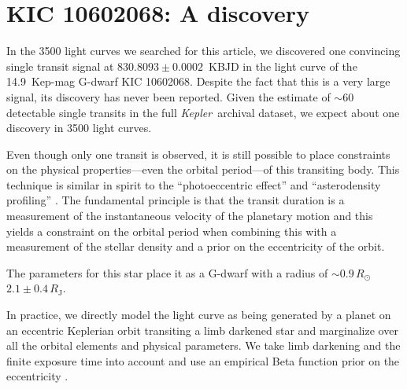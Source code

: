 \documentclass[12pt,preprint]{aastex}
\newcommand{\project}[1]{\textsl{#1}}
\newcommand{\kepler}{\project{Kepler}}
\newcommand{\paper}{article}
\newcommand{\sectlabel}[1]{\label{sect:#1}}
\begin{document}
\section{KIC 10602068: A discovery}\sectlabel{params}

In the 3500 light curves we searched for this \paper, we discovered one
convincing single transit signal at $830.8093\pm0.0002$~KBJD in the light
curve of the 14.9~Kep-mag G-dwarf KIC 10602068.
Despite the fact that this is a very large signal, its discovery has never
been reported.
Given the estimate of $\sim 60$ detectable single transits in the full
\kepler\ archival dataset, we expect about one discovery in 3500 light curves.

Even though only one transit is observed, it is still possible to place
constraints on the physical properties---even the orbital period---of this
transiting body.
This technique is similar in spirit to the ``photoeccentric effect''
\citep{Dawson:2012} and ``asterodensity profiling'' \citep{Kipping:2012}.
The fundamental principle is that the transit duration is a measurement of
the instantaneous velocity of the planetary motion and this yields a
constraint on the orbital period when combining this with a measurement of the
stellar density and a prior on the eccentricity of the orbit.

The \citet{Huber:2014} parameters for this star place it as a G-dwarf with a
radius of $\sim 0.9\,R_\odot$
$2.1 \pm 0.4\,R_\mathrm{J}$.

In practice, we directly model the light curve as being generated by a planet
on an eccentric Keplerian orbit transiting a limb darkened star and
marginalize over all the orbital elements and physical parameters.
We take limb darkening and the finite exposure time into account
\citep{Mandel:2002, Kipping:2010, Kipping:2013} and use an empirical
Beta function prior on the eccentricity \citep{Kipping:2013a}.
\end{document}
